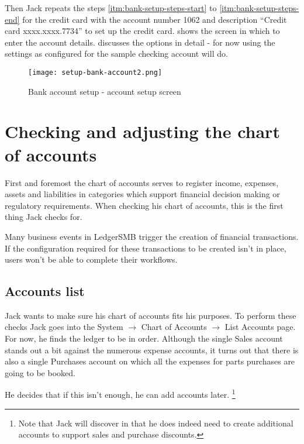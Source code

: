 Then Jack repeats the steps \ref{itm:bank-setup-steps-start} to \ref{itm:bank-setup-steps-end}
for the credit card with the account number 1062 and description ``Credit card xxxx.xxxx.7734'' to set
up the credit card.  shows the screen in which to enter the account
details.  discusses the options in detail - for now using the
settings as configured for the sample checking account will do.

\begin{figure}[h]
\texttt{[image: setup-bank-account2.png]}
\caption{Bank account setup - account setup screen}
\label{fig:bank-setup2}
\end{figure}


\section{Checking and adjusting the chart of accounts}
\label{sec-first-login-coa-check}

First and foremost the chart of accounts serves to register income, expenses,
assets and liabilities in categories which support financial decision making or
regulatory requirements. When checking his chart of accounts, this is the first
thing Jack checks for.

Many business events in LedgerSMB trigger the creation of financial transactions.
If the configuration required for these transactions to be created isn't in place,
users won't be able to complete their workflows. 

\subsection{Accounts list}
\label{subsec-first-login-accounts-list}

Jack wants to make sure his chart of accounts fits his purposes. To perform these
checks Jack goes into the System $\rightarrow$ Chart of Accounts $\rightarrow$
List Accounts page. For now, he finds
the ledger to be in order. Although the single Sales account stands out a bit against
the numerous expense accounts, it turns out that there is also a single Purchases
account on which all the expenses for parts purchases are going to be booked.

He decides that if this isn't enough, he can add accounts later.
\footnote{Note that Jack will discover in  that
he does indeed need to create additional accounts to support sales and
purchase discounts.}


